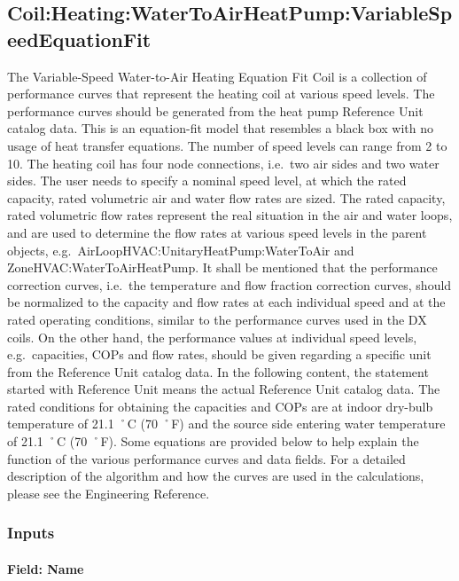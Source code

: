 \subsection{Coil:Heating:WaterToAirHeatPump:VariableSpeedEquationFit}\label{coilheatingwatertoairheatpumpvariablespeedequationfit}

The Variable-Speed Water-to-Air Heating Equation Fit Coil is a collection of performance curves that represent the heating coil at various speed levels. The performance curves should be generated from the heat pump Reference Unit catalog data. This is an equation-fit model that resembles a black box with no usage of heat transfer equations. The number of speed levels can range from 2 to 10. The heating coil has four node connections, i.e.~two air sides and two water sides. The user needs to specify a nominal speed level, at which the rated capacity, rated volumetric air and water flow rates are sized. The rated capacity, rated volumetric flow rates represent the real situation in the air and water loops, and are used to determine the flow rates at various speed levels in the parent objects, e.g.~AirLoopHVAC:UnitaryHeatPump:WaterToAir and ZoneHVAC:WaterToAirHeatPump. It shall be mentioned that the performance correction curves, i.e.~the temperature and flow fraction correction curves, should be normalized to the capacity and flow rates at each individual speed and at the rated operating conditions, similar to the performance curves used in the DX coils. On the other hand, the performance values at individual speed levels, e.g.~capacities, COPs and flow rates, should be given regarding a specific unit from the Reference Unit catalog data. In the following content, the statement started with Reference Unit means the actual Reference Unit catalog data. The rated conditions for obtaining the capacities and COPs are at indoor dry-bulb temperature of 21.1 ˚C (70 ˚F) and the source side entering water temperature of 21.1 ˚C (70 ˚F). Some equations are provided below to help explain the function of the various performance curves and data fields. For a detailed description of the algorithm and how the curves are used in the calculations, please see the Engineering Reference.

\subsubsection{Inputs}\label{inputs-34}

\paragraph{Field: Name}\label{field-name-33}

